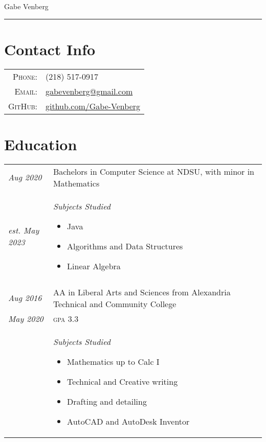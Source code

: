 \documentclass[letterpaper,10pt]{article}
\begin{document}
\pagestyle{empty}%
	\par{\centering
		{\huge Gabe Venberg
	}\bigskip\par}
\hrule
\section*{Contact Info}
	\begin{tabular}{rl}
	\textsc{Phone:} & (218) 517-0917\\
	\textsc{Email:} & \href{mailto:gabevenberg@gmail.com}{gabevenberg@gmail.com}\\
	\textsc{GitHub:} & \href{https://github.com/Gabe-Venberg}{github.com/Gabe-Venberg}\\
	\end{tabular}
\section*{Education}
	\begin{tabular}{R{2cm}|p{14cm}}
	\textsl{Aug 2020} & Bachelors in Computer Science at NDSU, with minor in Mathematics\\
	\textsl{est. May 2023} & \textsl{Subjects Studied}
	\begin{itemize}[noitemsep]
		\item Java
		\item Algorithms and Data Structures
		\item Linear Algebra
	\end{itemize}\\
	\\
	\textsl{Aug 2016} & AA in Liberal Arts and Sciences from Alexandria Technical and Community College\\
	\textsl{May 2020} & \textsc{gpa} 3.3\\
	&\textsl{Subjects Studied}
	\begin{itemize}[noitemsep]
		\item Mathematics up to Calc I
		\item Technical and Creative writing
		\item Drafting and detailing
		\item AutoCAD and AutoDesk Inventor
	\end{itemize}
	\end{tabular}
\end{document}
